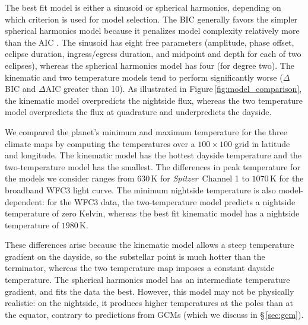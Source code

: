 \documentclass[twocolumn]{aastex61}
\newcommand{\project}[1]{\textsl{#1}}
\newcommand{\Spitzer}{\project{Spitzer}}
\begin{document}

The best fit model is either a sinusoid or spherical harmonics, depending on which criterion is used for model selection. The BIC generally favors the simpler spherical harmonics model because it penalizes model complexity relatively more than the AIC \citep{kass95}. The sinusoid has eight free parameters (amplitude, phase offset, eclipse duration, ingress/egress duration, and midpoint and depth for each of two eclipses), whereas the spherical harmonics model has four (for degree two).  The kinematic and two temperature models tend to perform significantly worse ($\Delta$BIC and $\Delta$AIC greater than 10).  As illustrated in Figure\,\ref{fig:model_comparison}, the kinematic model overpredicts the nightside flux, whereas the two temperature model overpredicts the flux at quadrature and underpredicts the dayside. 

We compared the planet's minimum and maximum temperature for the three climate maps by computing the temperatures over a $100\times100$ grid in latitude and longitude. The kinematic model has the hottest dayside temperature and the two-temperature model has the smallest. The differences in peak temperature for the models we consider ranges from $630\,\mathrm{K}$ for \Spitzer\ Channel 1 to $1070\,\mathrm{K}$ for the broadband WFC3 light curve. The minimum nightside temperature is also model-dependent: for the WFC3 data, the two-temperature model predicts a nightside temperature of zero Kelvin, whereas the best fit kinematic model has a nightside temperature of $1980\,\mathrm{K}$. %

These differences arise because the kinematic model allows a steep temperature gradient on the dayside, so the substellar point is much hotter than the terminator, whereas the two temperature map imposes a constant dayside temperature.  The spherical harmonics model has an intermediate temperature gradient, and fits the data the best. However, this model may not be physically realistic: on the nightside, it produces higher temperatures at the poles than at the equator, contrary to predictions from GCMs (which we discuss in \S\,\ref{sec:gcm}). 
\end{document}

